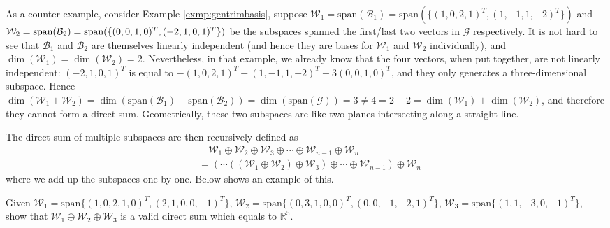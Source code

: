 As a counter-example, consider Example \ref{exmp:gentrimbasis}, suppose $\mathcal{W}_1 = \text{span}(\mathcal{B}_1) = \text{span}(\{(1,0,2,1)^T, (1,-1,1,-2)^T\})$ and $\mathcal{W}_2 = \text{span}(\mathcal{B}_2) = \text{span}(\{(0,0,1,0)^T, \\(-2,1,0,1)^T\})$ be the subspaces spanned the first/last two vectors in $\mathcal{G}$ respectively. It is not hard to see that $\mathcal{B}_1$ and $\mathcal{B}_2$ are themselves linearly independent (and hence they are bases for $\mathcal{W}_1$ and $\mathcal{W}_2$ individually), and $\dim(\mathcal{W}_1) = \dim(\mathcal{W}_2) = 2$. Nevertheless, in that example, we already know that the four vectors, when put together, are not linearly independent: $(-2,1,0,1)^T$ is equal to $-(1,0,2,1)^T-(1,-1,1,-2)^T+3(0,0,1,0)^T$, and they only generates a three-dimensional subspace. Hence $\dim(\mathcal{W}_1 + \mathcal{W}_2) = \dim(\text{span}(\mathcal{B}_1) + \text{span}(\mathcal{B}_2)) = \dim(\text{span}(\mathcal{G})) = 3 \neq 4 = 2+2 = \dim(\mathcal{W}_1) + \dim(\mathcal{W}_2)$, and therefore they cannot form a direct sum. Geometrically, these two subspaces are like two planes intersecting along a straight line.\par
The direct sum of multiple subspaces are then recursively defined as
\begin{align*}
&\quad \mathcal{W}_1 \oplus \mathcal{W}_2 \oplus \mathcal{W}_3 \oplus \cdots \oplus \mathcal{W}_{n-1} \oplus \mathcal{W}_n \\
&= (\cdots((\mathcal{W}_1 \oplus \mathcal{W}_2) \oplus \mathcal{W}_3) \oplus \cdots \oplus \mathcal{W}_{n-1}) \oplus \mathcal{W}_n
\end{align*}
where we add up the subspaces one by one. Below shows an example of this.
\begin{exmp}
\label{exmp:directsum}
Given $\mathcal{W}_1 = \text{span}\{(1,0,2,1,0)^T, (2,1,0,0,-1)^T\}$, $\mathcal{W}_2 = \text{span}\{(0,3,1,0,0)^T, (0,0,-1,-2,1)^T\}$, $\mathcal{W}_3 = \text{span}\{(1,1,-3,0,-1)^T\}$, show that $\mathcal{W}_1 \oplus \mathcal{W}_2 \oplus \mathcal{W}_3$ is a valid direct sum which equals to $\mathbb{R}^5$.
\end{exmp}
